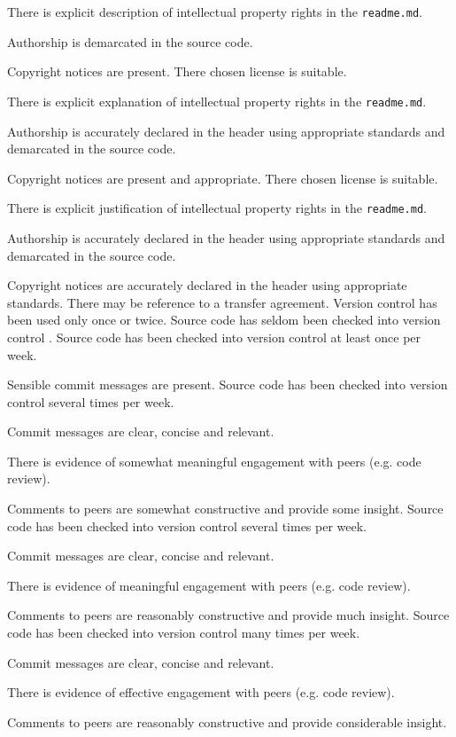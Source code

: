 \documentclass{../../fal_assignment}
\begin{document}
\begin{markingrubric}
            \par There is explicit description of intellectual property rights in the \texttt{readme.md}.
            \par Authorship is demarcated in the source code.
            \par Copyright notices are present.
        \grade There chosen license is suitable. 
            \par There is explicit explanation of intellectual property rights in the \texttt{readme.md}.
            \par Authorship is accurately declared in the header using appropriate standards and demarcated in the source code.
            \par Copyright notices are present and appropriate.
        \grade There chosen license is suitable.
            \par There is explicit justification of intellectual property rights in the \texttt{readme.md}.
            \par Authorship is accurately declared in the header using appropriate standards and demarcated in the source code.
            \par Copyright notices are accurately declared in the header using appropriate standards. There may be reference to a transfer agreement.
%
        \grade\fail Version control  has been used only once or twice.
        \grade Source code has seldom been checked into version control .
        \grade Source code has been checked into version control  at least once per week.
            \par Sensible commit messages are present.
        \grade Source code  has been checked into version control  several times per week.
            \par Commit messages are clear, concise and relevant.
            \par There is evidence of somewhat meaningful engagement with peers (e.g. code review).
            \par Comments to peers are somewhat constructive and provide some insight.
        \grade Source code has been checked into version control  several times per week.
            \par Commit messages are clear, concise and relevant.
            \par There is evidence of meaningful engagement with peers (e.g. code review).
            \par Comments to peers are reasonably constructive and provide much insight.
        \grade Source code has been checked into version control  many times per week.
            \par Commit messages are clear, concise and relevant.
            \par There is evidence of effective engagement with peers (e.g. code review).
            \par Comments to peers are reasonably constructive and provide considerable insight.
%
\end{markingrubric}
\end{document}
